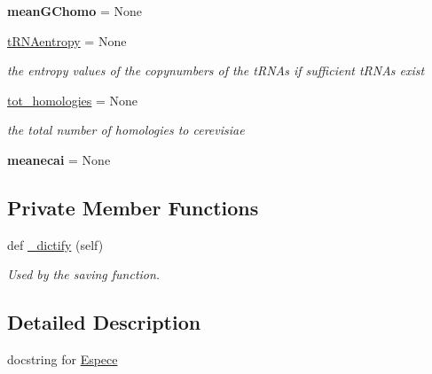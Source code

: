 \begin{DoxyCompactItemize}
\mbox{\label{class_py_c_u_b_1_1espece_1_1_espece_a32834ad6a3a42b850438789ae1e7270b}} 
{\bfseries mean\+G\+Chomo} = None
\item 
\mbox{\label{class_py_c_u_b_1_1espece_1_1_espece_a5fdd0450239ab1bbe67a22e51caf15c6}} 
\mbox{\hyperlink{class_py_c_u_b_1_1espece_1_1_espece_a5fdd0450239ab1bbe67a22e51caf15c6}{t\+R\+N\+Aentropy}} = None
\begin{DoxyCompactList}\small\item\em the entropy values of the copynumbers of the t\+R\+N\+As if sufficient t\+R\+N\+As exist \end{DoxyCompactList}\item 
\mbox{\label{class_py_c_u_b_1_1espece_1_1_espece_a283d26f1b90fe5a4afb4cb4d950b946f}} 
\mbox{\hyperlink{class_py_c_u_b_1_1espece_1_1_espece_a283d26f1b90fe5a4afb4cb4d950b946f}{tot\+\_\+homologies}} = None
\begin{DoxyCompactList}\small\item\em the total number of homologies to cerevisiae \end{DoxyCompactList}\item 
\mbox{\label{class_py_c_u_b_1_1espece_1_1_espece_af1c5763db7472083035dd6ccb6904a0c}} 
{\bfseries meanecai} = None
\end{DoxyCompactItemize}
\subsection*{Private Member Functions}
\begin{DoxyCompactItemize}
\item 
def \mbox{\hyperlink{class_py_c_u_b_1_1espece_1_1_espece_a4edfabc363a5d4be437afb94f5d03368}{\+\_\+dictify}} (self)
\begin{DoxyCompactList}\small\item\em Used by the saving function. \end{DoxyCompactList}\end{DoxyCompactItemize}


\subsection{Detailed Description}
docstring for \mbox{\hyperlink{class_py_c_u_b_1_1espece_1_1_espece}{Espece}} 

